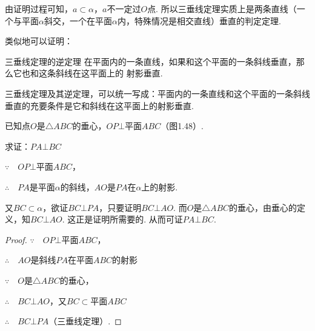 由证明过程可知，$a\subset\alpha$，$a$不一定过$O$点. 所以三垂线定理实质上是两条直线（一个与平面$\alpha$斜交，一个在平面$\alpha$内，特殊情况是相交直线）垂直的判定定理.

类似地可以证明：

\begin{thm}
  {三垂线定理的逆定理} 在平面内的一条直线，如果和这个平面的一条斜线垂直，那么它也和这条斜线在这平面上的
射影垂直.  
\end{thm}

三垂线定理及其逆定理，可以统一写成：平面内的一条直线和这个平面的一条斜线垂直的充要条件是它和斜线在这平面上的射影垂直.

\begin{example}
    已知点$O$是$\triangle ABC$的垂心，$OP\bot$平面$ABC$（图1.48）.

求证：$PA\bot BC$
\end{example}

\noindent
\begin{minipage}{.6\textwidth}\CTEXindent
\begin{analyze}
    $\because\quad OP\bot $平面$ABC$，
    
    $\therefore\quad PA$是平面$\alpha$的斜线，$AO$是$PA$在$\alpha$上的射影. 
    
    又$BC\subset\alpha$，欲证$BC\bot PA$，只要证明$BC\bot AO$. 而$O$是$\triangle ABC$的垂心，由垂心的定义，知$BC\bot AO$. 这正是证明所需要的. 从而可证$PA\bot BC$.
    \end{analyze}


\end{minipage}
\hfill
\begin{minipage}{.38\textwidth}
\centering
{}
\end{minipage}

\begin{proof}
$\because\quad OP\bot$平面$ABC$，

$\therefore\quad AO$是斜线$PA$在平面$ABC$的射影

$\because\quad O$是$\triangle ABC$的垂心，

$\therefore\quad BC\bot AO$，又$BC\subset $平面$ABC$

$\therefore\quad BC\bot PA$（三垂线定理）.
\end{proof}

